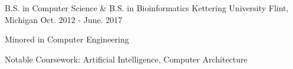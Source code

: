 
\begin{cventries}




  \cventry
    {B.S. in Computer Science \& B.S. in Bioinformatics} %
    {Kettering University} %
    {Flint, Michigan} %
    {Oct. 2012 - June. 2017} %
    {
      \begin{cvitems} %
        \item {Minored in Computer Engineering}
        \item {Notable Coursework: Artificial Intelligence, Computer Architecture}
      \end{cvitems}
    }

\end{cventries}
